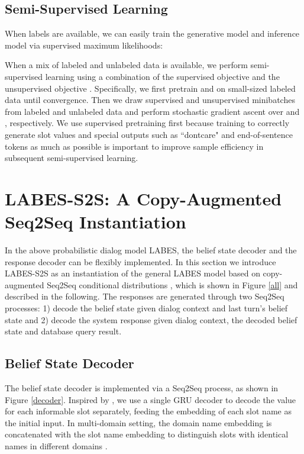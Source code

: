 \documentclass[11pt,a4paper]{article}
\newcommand{\modelname}{LABES}
\begin{document}
\subsection*{Semi-Supervised Learning}
	When  labels are available, we can easily train the generative model  and inference model  via supervised maximum likelihoods:



When a mix of labeled and unlabeled data is available, we perform semi-supervised learning using a combination of the supervised objective  and the unsupervised objective .
	Specifically, we first pretrain  and  on small-sized labeled data until convergence. Then we draw supervised and unsupervised minibatches from labeled and unlabeled data and perform stochastic gradient ascent over  and , respectively. We use supervised pretraining first because training  to correctly generate slot values and special outputs such as ``dontcare" and end-of-sentence tokens 
	as much as possible is important to improve sample efficiency in subsequent semi-supervised learning.
	
	
	
\section{\modelname{}-S2S: A Copy-Augmented Seq2Seq Instantiation}
	\label{sec:impl}


	In the above probabilistic dialog model \modelname{}, the belief state decoder  and the response decoder  can be flexibly implemented.
	In this section we introduce \modelname{}-S2S as an instantiation of the general \modelname{} model based on copy-augmented Seq2Seq conditional distributions \cite{gu2016incorporating}, which is shown in Figure \ref{all} and described in the following.
The responses are generated through two Seq2Seq processes: 1) decode the belief state given dialog context and last turn's belief state and 2) decode the system response given dialog context, the decoded belief state and database query result. 


	
	
\subsection*{Belief State Decoder} 
The belief state decoder is implemented via a Seq2Seq process, as shown in Figure \ref{decoder}. Inspired by \citet{fsdm}, we use a single GRU decoder to decode the value for each informable slot separately, feeding the embedding of each slot name as the initial input. In multi-domain setting, the domain name embedding is concatenated with the slot name embedding to distinguish slots with identical names in different domains \cite{wu2019transferable}. 
	
\end{document}
